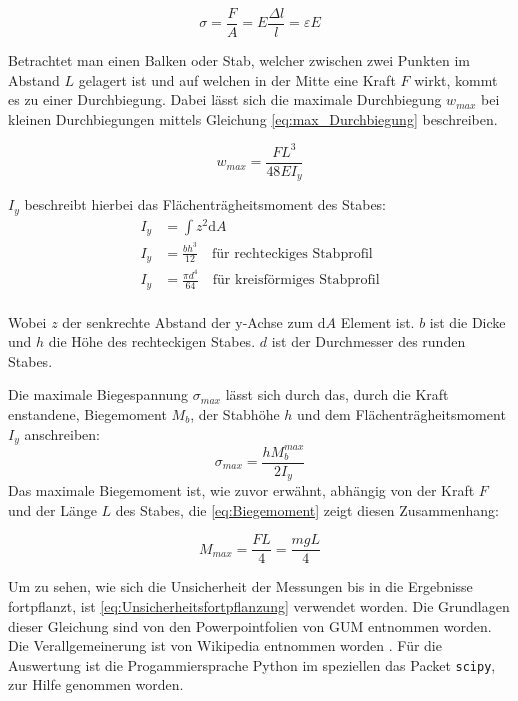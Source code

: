 \documentclass[11pt,ngerman]{scrartcl}
\begin{document}
\begin{equation}
	\label{eq:Dehnung_Spannung}
	\sigma = \frac{F}{A} = E\frac{\Delta l}{l} = \varepsilon E
\end{equation}

Betrachtet man einen Balken oder Stab, welcher zwischen zwei Punkten im Abstand
$L$ gelagert ist und auf welchen in der Mitte eine Kraft $F$ wirkt, kommt es zu
einer Durchbiegung.  Dabei lässt sich die maximale Durchbiegung $w_{max}$ bei
kleinen Durchbiegungen mittels Gleichung \ref{eq:max_Durchbiegung} beschreiben.

\begin{equation}
	\label{eq:max_Durchbiegung}
	w_{max} = \frac{FL^3}{48EI_y}
\end{equation}

$I_y$ beschreibt hierbei das Flächenträgheitsmoment des Stabes:
\begin{align}
	I_y & = \int z^2 \text{d}A                                                                                      \\
	I_y & = \frac{bh^3}{12} \quad  \text{für rechteckiges Stabprofil}  \label{eq:Flaechentraegheitsmoment_Rechteck} \\
	I_y & = \frac{\pi d^4}{64}  \quad \text{für kreisförmiges Stabprofil} \label{eq:Flaechentraegheitsmoment_Kreis} \\
\end{align}

Wobei $z$ der senkrechte Abstand der y-Achse zum $\text{d}A$ Element ist. $b$ ist die
Dicke und $h$ die Höhe des rechteckigen Stabes. $d$ ist der Durchmesser
des runden Stabes.

Die maximale Biegespannung $\sigma_{max}$ lässt sich durch das, durch die Kraft
enstandene, Biegemoment $M_b$, der Stabhöhe $h$ und dem Flächenträgheitsmoment $I_y$
anschreiben:
\begin{equation}
	\label{eq:Spannung_max}
	\sigma_{max} = \frac{hM^{max}_b}{2I_y}
\end{equation}
Das maximale Biegemoment ist, wie zuvor erwähnt, abhängig von der Kraft $F$ und
der Länge $L$ des Stabes, die \autoref{eq:Biegemoment} zeigt diesen Zusammenhang:

\begin{equation}
	\label{eq:Biegemoment}
	M_{max} = \frac{FL}{4} = \frac{mgL}{4}
\end{equation}

Um zu sehen, wie sich die Unsicherheit der Messungen bis in die Ergebnisse
fortpflanzt, ist \autoref{eq:Unsicherheitsfortpflanzung} verwendet worden.
Die Grundlagen dieser Gleichung sind von den Powerpointfolien von
GUM entnommen worden.\cite{WolfgangKessel2004} Die Verallgemeinerung ist von Wikipedia entnommen
worden \cite{2020Fehler}.
Für die Auswertung ist die Progammiersprache Python im speziellen das
Packet \verb#scipy#, zur Hilfe genommen worden.
\end{document}
